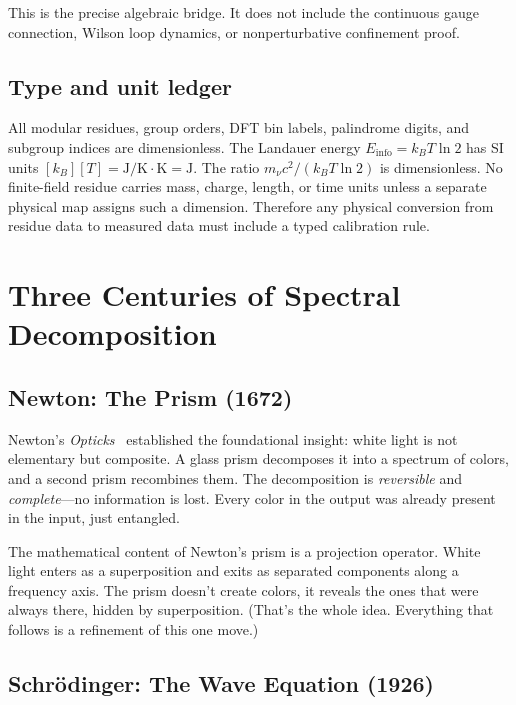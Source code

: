 This is the precise algebraic bridge. It does not include the continuous gauge connection, Wilson loop dynamics, or nonperturbative confinement proof.

\subsection{Type and unit ledger}

All modular residues, group orders, DFT bin labels, palindrome digits, and subgroup indices are dimensionless. The Landauer energy $E_{\mathrm{info}} = k_B T \ln 2$ has SI units $[k_B][T] = \text{J/K} \cdot \text{K} = \text{J}$. The ratio $m_\nu c^2 / (k_B T \ln 2)$ is dimensionless. No finite-field residue carries mass, charge, length, or time units unless a separate physical map assigns such a dimension. Therefore any physical conversion from residue data to measured data must include a typed calibration rule.

\section{Three Centuries of Spectral Decomposition}


\subsection{Newton: The Prism (1672)}

Newton's \emph{Opticks}~\cite{newton} established the foundational insight: white light is not elementary but composite. A glass prism decomposes it into a spectrum of colors, and a second prism recombines them. The decomposition is \emph{reversible} and \emph{complete}---no information is lost. Every color in the output was already present in the input, just entangled.

The mathematical content of Newton's prism is a projection operator. White light enters as a superposition and exits as separated components along a frequency axis. The prism doesn't create colors, it reveals the ones that were always there, hidden by superposition. (That's the whole idea. Everything that follows is a refinement of this one move.)

\subsection{Schr\"odinger: The Wave Equation (1926)}

